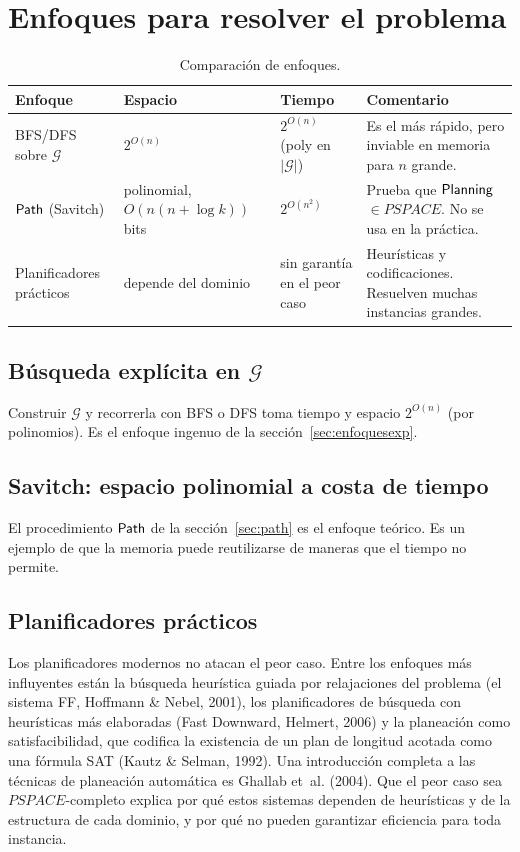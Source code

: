 \documentclass[11pt,letterpaper]{article}
\theoremstyle{plain}
\theoremstyle{definition}
\theoremstyle{remark}
\newcommand{\nombreMat}[1]{\ensuremath{\text{\fontencoding{OT1}\fontfamily{cmss}\upshape\selectfont #1}}}
\newcommand{\PSPACE}{\nombreMat{PSPACE}}
\newcommand{\NP}{\nombreMat{NP}}
\newcommand{\coNP}{\nombreMat{co-NP}}
\newcommand{\PLANNING}{\nombreMat{Planning}}
\newcommand{\Path}{\nombreMat{Path}}
\def\PSPACE{PSPACE}\def\NP{NP}\def\coNP{co-NP}%
\begin{document}
\section{Enfoques para resolver el problema}

\begin{table}[ht]
\centering
\small
\begin{tabular}{@{}p{3.3cm}p{3.2cm}p{3.5cm}p{4.4cm}@{}}
\toprule
Enfoque & Espacio & Tiempo & Comentario\\
\midrule
BFS/DFS sobre $\mathcal{G}$ & $2^{O(n)}$ & $2^{O(n)}$ (poly en $|\mathcal{G}|$) & Es el más rápido, pero inviable en memoria para $n$ grande.\\
$\Path$ (Savitch) & polinomial, $O(n(n+\log k))$ bits & $2^{O(n^{2})}$ & Prueba que \PLANNING{} $\in\PSPACE$. No se usa en la práctica.\\
Planificadores prácticos & depende del dominio & sin garantía en el peor caso & Heurísticas y codificaciones. Resuelven muchas instancias grandes.\\
\bottomrule
\end{tabular}
\caption{Comparación de enfoques.}
\end{table}

\subsection{Búsqueda explícita en $\mathcal{G}$}
Construir $\mathcal{G}$ y recorrerla con BFS o DFS toma tiempo y espacio $2^{O(n)}$ (por polinomios). Es el enfoque ingenuo de la sección~\ref{sec:enfoquesexp}.

\subsection{Savitch: espacio polinomial a costa de tiempo}
El procedimiento $\Path$ de la sección~\ref{sec:path} es el enfoque teórico. Es un ejemplo de que la memoria puede reutilizarse de maneras que el tiempo no permite.

\subsection{Planificadores prácticos}
Los planificadores modernos no atacan el peor caso. Entre los enfoques más influyentes están la búsqueda heurística guiada por relajaciones del problema (el sistema FF, Hoffmann \& Nebel, 2001), los planificadores de búsqueda con heurísticas más elaboradas (Fast Downward, Helmert, 2006) y la planeación como satisfacibilidad, que codifica la existencia de un plan de longitud acotada como una fórmula SAT (Kautz \& Selman, 1992).
Una introducción completa a las técnicas de planeación automática es Ghallab et~al. (2004). Que el peor caso sea $\PSPACE$-completo explica por qué estos sistemas dependen de heurísticas y de la estructura de cada dominio, y por qué no pueden garantizar eficiencia para toda instancia.
\end{document}
